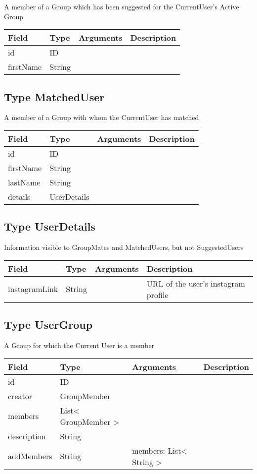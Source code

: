 A member of a Group which has been suggested for the CurrentUser's
Active Group

\begin{longtable}[]{@{}llll@{}}
\toprule
Field & Type & Arguments & Description\tabularnewline
\midrule
\endhead
id & ID & &\tabularnewline
firstName & String & &\tabularnewline
\bottomrule
\end{longtable}

\hypertarget{type-matcheduser}{%
\subsection{Type MatchedUser}\label{type-matcheduser}}

A member of a Group with whom the CurrentUser has matched

\begin{longtable}[]{@{}llll@{}}
\toprule
Field & Type & Arguments & Description\tabularnewline
\midrule
\endhead
id & ID & &\tabularnewline
firstName & String & &\tabularnewline
lastName & String & &\tabularnewline
details & UserDetails & &\tabularnewline
\bottomrule
\end{longtable}

\hypertarget{type-userdetails}{%
\subsection{Type UserDetails}\label{type-userdetails}}

Information visible to GroupMates and MatchedUsers, but not
SuggestedUsers

\begin{longtable}[]{@{}llll@{}}
\toprule
Field & Type & Arguments & Description\tabularnewline
\midrule
\endhead
instagramLink & String & & URL of the user's instagram
profile\tabularnewline
\bottomrule
\end{longtable}

\hypertarget{type-usergroup}{%
\subsection{Type UserGroup}\label{type-usergroup}}

A Group for which the Current User is a member

\begin{longtable}[]{@{}llll@{}}
\toprule
Field & Type & Arguments & Description\tabularnewline
\midrule
\endhead
id & ID & &\tabularnewline
creator & GroupMember & &\tabularnewline
members & List\textless{} GroupMember \textgreater{} & &\tabularnewline
description & String & &\tabularnewline
addMembers & String & members: List\textless{} String \textgreater{}
&\tabularnewline
\bottomrule
\end{longtable}

